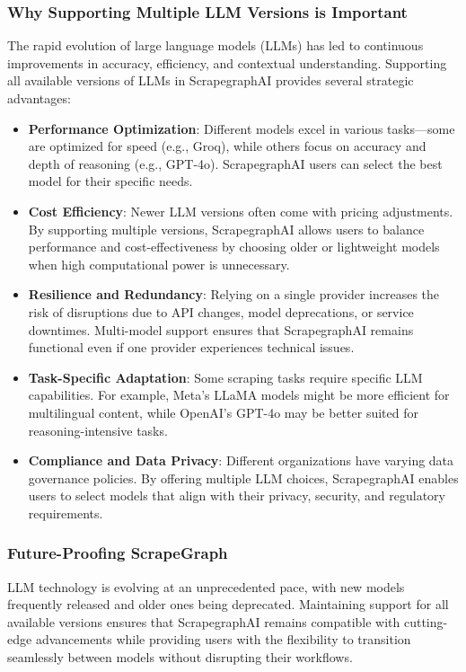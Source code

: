 \subsubsection{Why Supporting Multiple LLM Versions is Important}

The rapid evolution of large language models (LLMs) has led to continuous improvements in accuracy, efficiency, and contextual understanding. Supporting all available versions of LLMs in ScrapegraphAI provides several strategic advantages:

\begin{itemize}
    \item \textbf{Performance Optimization}: Different models excel in various tasks—some are optimized for speed (e.g., Groq), while others focus on accuracy and depth of reasoning (e.g., GPT-4o). ScrapegraphAI users can select the best model for their specific needs.
    \item \textbf{Cost Efficiency}: Newer LLM versions often come with pricing adjustments. By supporting multiple versions, ScrapegraphAI allows users to balance performance and cost-effectiveness by choosing older or lightweight models when high computational power is unnecessary.
    \item \textbf{Resilience and Redundancy}: Relying on a single provider increases the risk of disruptions due to API changes, model deprecations, or service downtimes. Multi-model support ensures that ScrapegraphAI remains functional even if one provider experiences technical issues.
    \item \textbf{Task-Specific Adaptation}: Some scraping tasks require specific LLM capabilities. For example, Meta’s LLaMA models might be more efficient for multilingual content, while OpenAI’s GPT-4o may be better suited for reasoning-intensive tasks.
    \item \textbf{Compliance and Data Privacy}: Different organizations have varying data governance policies. By offering multiple LLM choices, ScrapegraphAI enables users to select models that align with their privacy, security, and regulatory requirements.
\end{itemize}

\subsubsection{Future-Proofing ScrapeGraph}

LLM technology is evolving at an unprecedented pace, with new models frequently released and older ones being deprecated. Maintaining support for all available versions ensures that ScrapegraphAI remains compatible with cutting-edge advancements while providing users with the flexibility to transition seamlessly between models without disrupting their workflows.

